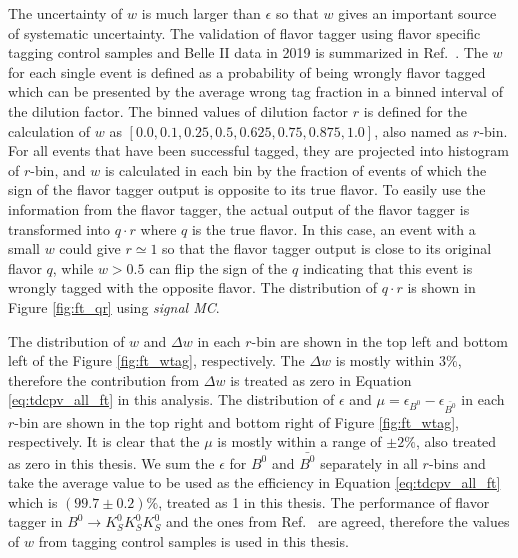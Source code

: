 The uncertainty of $w$ is much larger than $\epsilon$ so that $w$ gives an important source of systematic uncertainty. The validation of flavor tagger using flavor specific tagging control samples and Belle II data in 2019 is summarized in Ref.~\cite{abudinen2020first}. The $w$ for each single event is defined as a probability of being wrongly flavor tagged which can be presented by the average wrong tag fraction in a binned interval of the dilution factor. The binned values of dilution factor $r$ is defined for the calculation of $w$ as $[0.0, 0.1, 0.25, 0.5, 0.625, 0.75, 0.875, 1.0]$, also named as $r$-bin. For all events that have been successful tagged, they are projected into histogram of $r$-bin, and $w$ is calculated in each bin by the fraction of events of which the sign of the flavor tagger output is opposite to its true flavor. To easily use the information from the flavor tagger, the actual output of the flavor tagger is transformed into $q\cdot r$ where $q$ is the true flavor. In this case, an event with a small $w$ could give $r\simeq 1$ so that the flavor tagger output is close to its original flavor $q$, while $w>0.5$ can flip the sign of the $q$ indicating that this event is wrongly tagged with the opposite flavor. The distribution of $q\cdot r$ is shown in Figure \ref{fig:ft_qr} using \textit{signal MC}.

The distribution of $w$ and $\Delta w$ in each $r$-bin are shown in the top left and bottom left of the Figure \ref{fig:ft_wtag}, respectively. The $\Delta w$ is mostly within $3\%$, therefore the contribution from $\Delta w$ is treated as zero in Equation \ref{eq:tdcpv_all_ft} in this analysis. The distribution of $\epsilon$ and $\mu = \epsilon_{B^0}-\epsilon_{\bar{B^0}}$ in each $r$-bin are shown in the top right and bottom right of Figure \ref{fig:ft_wtag}, respectively. It is clear that the $\mu$ is mostly within a range of $\pm2\%$, also treated as zero in this thesis. We sum the $\epsilon$ for $B^0$ and $\bar{B^0}$ separately in all $r$-bins and take the average value to be used as the efficiency in Equation \ref{eq:tdcpv_all_ft} which is $(99.7\pm0.2)\%$, treated as 1 in this thesis. The performance of flavor tagger in $B^0 \to K_S^0  K_S^0  K_S^0$ and the ones from Ref.~\cite{abudinen2020first} are agreed, therefore the values of $w$ from tagging control samples is used in this thesis.

